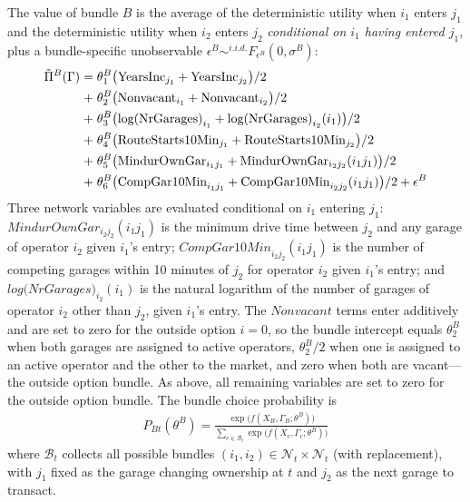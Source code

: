 \documentclass[12pt]{article}
\begin{document}
The value of bundle $B$ is the average of the deterministic utility when $i_1$ 
enters $j_1$ and the deterministic utility when $i_2$ enters $j_2$ 
\emph{conditional on $i_1$ having entered $j_1$}, plus a bundle-specific 
unobservable $\epsilon^B \sim^{i.i.d.} F_{\epsilon^B}(0,\sigma^B)$:
\begin{align}\label{eq:garagevalue_detail_bundle}
\tilde{\Pi}^B(\Gamma) =\; &\theta_1^B \big( \text{YearsInc}_{j_1}+ 
  \text{YearsInc}_{j_2}\big)/2 \notag \\
+\; &\theta_2^B \big(\text{Nonvacant}_{i_1} + \text{Nonvacant}_{i_2}\big)/2 \notag \\
+\; &\theta_3^B \big(\text{log(NrGarages)}_{i_1} + \text{log(NrGarages)}_{i_2}(i_1)\big)/2 \notag \\
+\; &\theta_4^B \big(\text{RouteStarts10Min}_{j_1} + 
    \text{RouteStarts10Min}_{j_2}\big)/2 \notag \\
+\; &\theta_5^B \big(\text{MindurOwnGar}_{i_1 j_1} + 
    \text{MindurOwnGar}_{i_2 j_2}(i_1 j_1)\big)/2 \notag \\
+\; &\theta_6^B \big(\text{CompGar10Min}_{i_1 j_1} + 
    \text{CompGar10Min}_{i_2 j_2}(i_1 j_1)\big)/2 + \epsilon^B
\end{align}
Three network variables are evaluated conditional on $i_1$ entering $j_1$: 
$\textit{MindurOwnGar}_{i_2 j_2}(i_1 j_1)$ is the minimum drive time between 
$j_2$ and any garage of operator $i_2$ given $i_1$'s entry; 
$\textit{CompGar10Min}_{i_2 j_2}(i_1 j_1)$ is the number of competing garages 
within 10 minutes of $j_2$ for operator $i_2$ given $i_1$'s entry; and 
$\textit{log(NrGarages)}_{i_2}(i_1)$ is the natural logarithm of the number of garages of operator $i_2$ 
other than $j_2$, given $i_1$'s entry. The $\textit{Nonvacant}$ terms enter 
additively and are set to zero for the outside option $i=0$, so the bundle 
intercept equals $\theta_2^B$ when both garages are assigned to active 
operators, $\theta_2^B/ 2$ when one is assigned to an active operator and the 
other to the market, and zero when both are vacant---the outside option bundle. 
As above, all remaining variables are set to zero for the outside option bundle. The bundle choice 
probability is
\begin{align}\label{eq:entryprob-bundle}
P_{Bt}(\theta^B) = \frac{\exp\!\Big(f(X_{B},\Gamma_{B};\theta^B)\Big)}
{\sum_{c \in \mathcal{B}_t} \exp\!\Big(f(X_{c},\Gamma_{c};\theta^B)\Big)}
\end{align}
where $\mathcal{B}_t$ collects all possible bundles $(i_1,i_2) \in 
\mathcal{N}_t \times \mathcal{N}_t$ (with replacement), with $j_1$ fixed 
as the garage changing ownership at $t$ and $j_2$ as the next garage to 
transact. 
\end{document}
